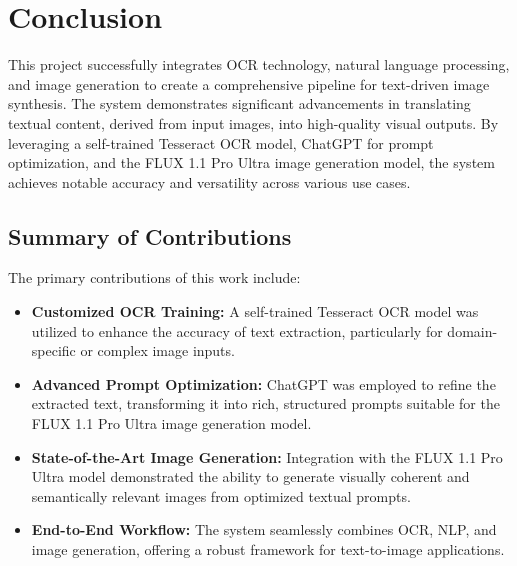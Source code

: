 \chapter{Conclusion}

This project successfully integrates OCR technology, natural language processing, and image generation to create a comprehensive pipeline for text-driven image synthesis. The system demonstrates significant advancements in translating textual content, derived from input images, into high-quality visual outputs. By leveraging a self-trained Tesseract OCR model, ChatGPT for prompt optimization, and the FLUX 1.1 Pro Ultra image generation model, the system achieves notable accuracy and versatility across various use cases.

\section{Summary of Contributions}
The primary contributions of this work include:
\begin{itemize}
    \item \textbf{Customized OCR Training:} A self-trained Tesseract OCR model was utilized to enhance the accuracy of text extraction, particularly for domain-specific or complex image inputs.
    \item \textbf{Advanced Prompt Optimization:} ChatGPT was employed to refine the extracted text, transforming it into rich, structured prompts suitable for the FLUX 1.1 Pro Ultra image generation model.
    \item \textbf{State-of-the-Art Image Generation:} Integration with the FLUX 1.1 Pro Ultra model demonstrated the ability to generate visually coherent and semantically relevant images from optimized textual prompts.
    \item \textbf{End-to-End Workflow:} The system seamlessly combines OCR, NLP, and image generation, offering a robust framework for text-to-image applications.
\end{itemize}

